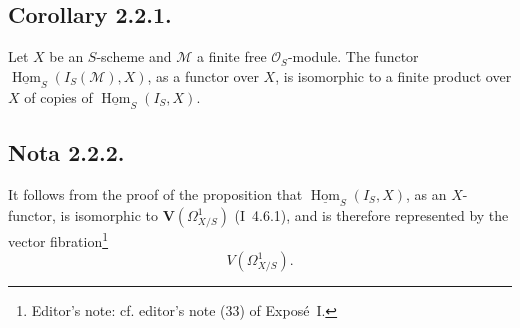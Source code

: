 \subsection*{Corollary 2.2.1.}
Let \(X\) be an \(S\)-scheme and \(\mathcal M\) a finite free
\(\mathcal O_S\)-module. The functor
\(\underline{\operatorname{Hom}}_S(I_S(\mathcal M),X)\), as a functor
over \(X\), is isomorphic to a finite product over \(X\) of copies of
\(\underline{\operatorname{Hom}}_S(I_S,X)\).

\subsection*{Nota 2.2.2.}
It follows from the proof of the proposition that
\(\underline{\operatorname{Hom}}_S(I_S,X)\), as an \(X\)-functor, is
isomorphic to \(\mathbf V(\Omega^1_{X/S})\) (I~4.6.1), and is therefore
represented by the vector fibration\footnote{Editor's note: cf. editor's
note (33) of Expos\'e~I.}
\[
  V(\Omega^1_{X/S}).
\]
